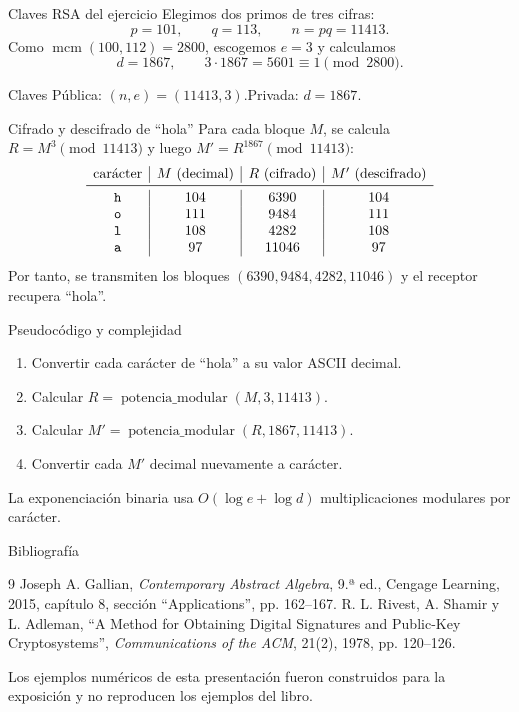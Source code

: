 \documentclass[aspectratio=169,11pt]{beamer}
\newcommand{\modn}[1]{\pmod{#1}}
\begin{document}
\begin{frame}{Claves RSA del ejercicio}
  Elegimos dos primos de tres cifras:
  \[
    p=101,\qquad q=113,\qquad n=pq=11413.
  \]
  Como $\operatorname{mcm}(100,112)=2800$, escogemos $e=3$ y calculamos
  \[
    d=1867,\qquad 3\cdot1867=5601\equiv1\modn{2800}.
  \]
  \begin{block}{Claves}
    Pública: $(n,e)=(11413,3)$.\qquad Privada: $d=1867$.
  \end{block}
\end{frame}

\begin{frame}{Cifrado y descifrado de ``hola''}
  Para cada bloque $M$, se calcula $R=M^3\modn{11413}$ y luego $M'=R^{1867}\modn{11413}$:
  \[
  \begin{array}{c|c|c|c}
  \text{carácter}&M\text{ (decimal)}&R\text{ (cifrado)}&M'\text{ (descifrado)}\\ \midrule
  \texttt{h}&104&6390&104\\
  \texttt{o}&111&9484&111\\
  \texttt{l}&108&4282&108\\
  \texttt{a}&97&11046&97
  \end{array}
  \]
  Por tanto, se transmiten los bloques $(6390,9484,4282,11046)$ y el receptor recupera ``hola''.
\end{frame}

\begin{frame}{Pseudocódigo y complejidad}
  \begin{enumerate}
    \item Convertir cada carácter de ``hola'' a su valor ASCII decimal.
    \item Calcular $R=\operatorname{potencia\_modular}(M,3,11413)$.
    \item Calcular $M'=\operatorname{potencia\_modular}(R,1867,11413)$.
    \item Convertir cada $M'$ decimal nuevamente a carácter.
  \end{enumerate}
  \vfill
  La exponenciación binaria usa $O(\log e+\log d)$ multiplicaciones modulares por carácter.
\end{frame}

\begin{frame}{Bibliografía}
  \begin{thebibliography}{9}
    Joseph A. Gallian, \textit{Contemporary Abstract Algebra}, 9.ª ed., Cengage Learning, 2015, capítulo 8, sección ``Applications'', pp. 162--167.
    R. L. Rivest, A. Shamir y L. Adleman, ``A Method for Obtaining Digital Signatures and Public-Key Cryptosystems'', \textit{Communications of the ACM}, 21(2), 1978, pp. 120--126.
  \end{thebibliography}
  \vfill
  \centering\small
  Los ejemplos numéricos de esta presentación fueron construidos para la exposición y no reproducen los ejemplos del libro.
\end{frame}
\end{document}
